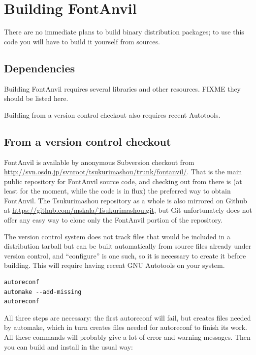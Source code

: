 \documentclass[11pt]{report}
\begin{document}
\chapter{Building FontAnvil}

There are no immediate plans to build binary distribution packages; to use
this code you will have to build it yourself from sources.

\section{Dependencies}

Building FontAnvil requires several libraries and other resources.  FIXME
they should be listed here.

Building from a version control checkout also requires recent Autotools.

\section{From a version control checkout}

FontAnvil is available by anonymous Subversion checkout from
\url{http://svn.osdn.jp/svnroot/tsukurimashou/trunk/fontanvil/}. 
That is the main public repository for FontAnvil source code, and checking
out from there is (at least for the moment, while the code is in flux) the
preferred way to obtain FontAnvil.  The Tsukurimashou repository as a whole
is also mirrored on Github at
\url{https://github.com/mskala/Tsukurimashou.git}, but Git unfortunately
does not offer any easy way to clone only the FontAnvil portion of the
repository.

The version control system does not track files that would be included in a
distribution tarball but can be built automatically from source files
already under version control, and ``configure'' is one such, so it is
necessary to create it before building.  This will require having recent GNU
Autotools on your system.

\begin{verbatim}
autoreconf
automake --add-missing
autoreconf
\end{verbatim}

All three steps are necessary:  the first autoreconf will fail, but creates
files needed by automake, which in turn creates files needed for autoreconf
to finish its work.  All these commands will probably give a lot of error
and warning messages.  Then you can build and install in the usual way:
\end{document}
